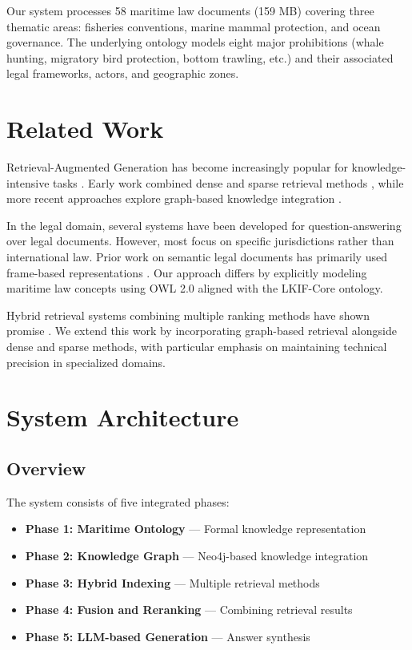 \documentclass[11pt,a4paper]{article}
\begin{document}
Our system processes 58 maritime law documents (159 MB) covering three thematic areas: fisheries conventions, marine mammal protection, and ocean governance. The underlying ontology models eight major prohibitions (whale hunting, migratory bird protection, bottom trawling, etc.) and their associated legal frameworks, actors, and geographic zones.

\section{Related Work}

Retrieval-Augmented Generation has become increasingly popular for knowledge-intensive tasks \citep{Lewis2020}. Early work combined dense and sparse retrieval methods \citep{Karpukhin2020}, while more recent approaches explore graph-based knowledge integration \citep{Wang2021}.

In the legal domain, several systems have been developed for question-answering over legal documents. However, most focus on specific jurisdictions rather than international law. Prior work on semantic legal documents has primarily used frame-based representations \citep{Wyner2012}. Our approach differs by explicitly modeling maritime law concepts using OWL 2.0 aligned with the LKIF-Core ontology.

Hybrid retrieval systems combining multiple ranking methods have shown promise \citep{Ren2021}. We extend this work by incorporating graph-based retrieval alongside dense and sparse methods, with particular emphasis on maintaining technical precision in specialized domains.

\section{System Architecture}

\subsection{Overview}

The system consists of five integrated phases:

\begin{itemize}
\item \textbf{Phase 1: Maritime Ontology} --- Formal knowledge representation
\item \textbf{Phase 2: Knowledge Graph} --- Neo4j-based knowledge integration
\item \textbf{Phase 3: Hybrid Indexing} --- Multiple retrieval methods
\item \textbf{Phase 4: Fusion and Reranking} --- Combining retrieval results
\item \textbf{Phase 5: LLM-based Generation} --- Answer synthesis
\end{itemize}
\end{document}
